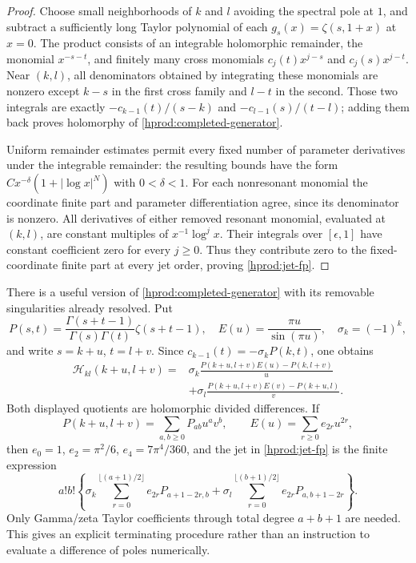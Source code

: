 \begin{proof}
Choose small neighborhoods of $k$ and $l$ avoiding the spectral pole at
$1$, and subtract a sufficiently
long Taylor polynomial of each $g_s(x)=\zeta(s,1+x)$ at $x=0$.
The product consists of an integrable holomorphic remainder, the
monomial $x^{-s-t}$, and finitely many cross monomials
$c_j(t)x^{j-s}$ and $c_j(s)x^{j-t}$.  Near $(k,l)$, all
denominators obtained by integrating these monomials are nonzero
except $k-s$ in the first cross family and $l-t$ in the second.
Those two integrals are exactly
$-c_{k-1}(t)/(s-k)$ and $-c_{l-1}(s)/(t-l)$; adding them
back proves holomorphy of \eqref{hprod:completed-generator}.

Uniform remainder estimates permit every fixed number of parameter
derivatives under the integrable remainder: the resulting bounds have
the form $C x^{-\delta}(1+|\log x|^N)$ with $0<\delta<1$.
For each nonresonant monomial the coordinate finite part and parameter
differentiation agree, since its denominator is nonzero.  All derivatives
of either removed resonant monomial, evaluated at $(k,l)$, are
constant multiples of $x^{-1}\log^j x$.  Their integrals over
$[\epsilon,1]$ have constant coefficient zero for every $j\ge0$.
Thus they contribute zero to the fixed-coordinate finite part at every
jet order, proving \eqref{hprod:jet-fp}.
\end{proof}

There is a useful version of \eqref{hprod:completed-generator} with
its removable singularities already resolved.  Put
\[
 P(s,t)=\frac{\Gamma(s+t-1)}{\Gamma(s)\Gamma(t)}\zeta(s+t-1),
 \quad E(u)=\frac{\pi u}{\sin(\pi u)},\quad
 \sigma_k=(-1)^k,
\]
and write $s=k+u$, $t=l+v$.  Since
$c_{k-1}(t)=-\sigma_kP(k,t)$, one obtains
\begin{equation}\label{hprod:divided-differences}
 \begin{split}
 \mathscr H_{kl}(k+u,l+v)
 ={}&\sigma_k\frac{P(k+u,l+v)E(u)-P(k,l+v)}u\\
 &+\sigma_l\frac{P(k+u,l+v)E(v)-P(k+u,l)}v.
 \end{split}
\end{equation}
Both displayed quotients are holomorphic divided differences.
If
\[
 P(k+u,l+v)=\sum_{a,b\ge0}P_{ab}u^av^b,
 \qquad E(u)=\sum_{r\ge0}e_{2r}u^{2r},
\]
then $e_0=1$, $e_2=\pi^2/6$, $e_4=7\pi^4/360$, and
the jet in \eqref{hprod:jet-fp} is the finite expression
\begin{equation}\label{hprod:finite-jet-algorithm}
 a!b!\left\{
 \sigma_k\sum_{r=0}^{\lfloor(a+1)/2\rfloor}e_{2r}P_{a+1-2r,b}
 +\sigma_l\sum_{r=0}^{\lfloor(b+1)/2\rfloor}e_{2r}P_{a,b+1-2r}
 \right\}.
\end{equation}
Only Gamma/zeta Taylor coefficients through total degree $a+b+1$
are needed.  This gives an explicit terminating procedure rather than
an instruction to evaluate a difference of poles numerically.

